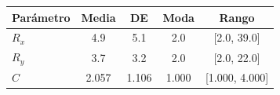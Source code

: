 \begin{tabular}{lcccc}
\hline
\textbf{Parámetro} & \textbf{Media} & \textbf{DE} & \textbf{Moda} & \textbf{Rango} \\
\hline
$R_x$ & 4.9 & 5.1 & 2.0 & [2.0, 39.0] \\
$R_y$ & 3.7 & 3.2 & 2.0 & [2.0, 22.0] \\
$C$ & 2.057 & 1.106 & 1.000 & [1.000, 4.000] \\
\hline
\end{tabular}